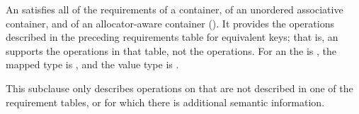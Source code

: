 \pnum
An  satisfies all of the requirements of a container, of an
unordered associative container, and of an allocator-aware container
(). It provides the operations described in the
preceding requirements table for equivalent keys; that is, an 
supports the  operations in that table, not the  operations.
For an  the  is , the
mapped type is , and the value type is .

\pnum
This subclause only describes operations on 
that are not described in one of the requirement tables, or for which
there is additional semantic information.

%
